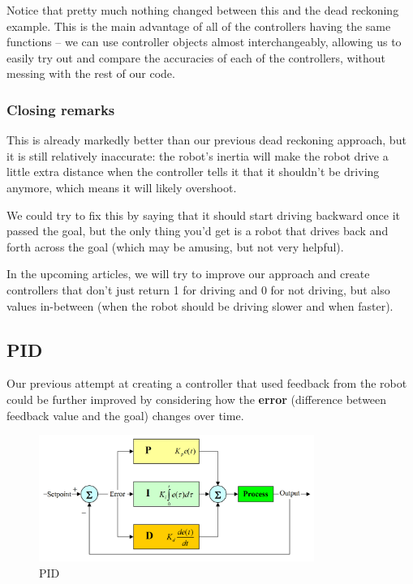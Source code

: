 \documentclass[12pt,twoside]{article}
\begin{document}
Notice that pretty much nothing changed between this and the dead reckoning example. This is the main advantage of all of the controllers having the same functions -- we can use controller objects almost interchangeably, allowing us to easily try out and compare the accuracies of each of the controllers, without messing with the rest of our code.


\subsubsection{Closing remarks}
This is already markedly better than our previous dead reckoning approach, but it is still relatively inaccurate: the robot's inertia will make the robot drive a little extra distance when the controller tells it that it shouldn't be driving anymore, which means it will likely overshoot.

We could try to fix this by saying that it should start driving backward once it passed the goal, but the only thing you'd get is a robot that drives back and forth across the goal (which may be amusing, but not very helpful).

In the upcoming articles, we will try to improve our approach and create controllers that don't just return 1 for driving and 0 for not driving, but also values in-between (when the robot should be driving slower and when faster).




\subsection{PID}
Our previous attempt at creating a controller that used feedback from the robot could be further improved by considering how the \textbf{error} (difference between feedback value and the goal) changes over time.

\begin{figure}[H]
\centering
\includegraphics[width=0.8\textwidth]{../assets/images/motor-controllers/pid.png}
\caption{PID}
\end{figure}
\end{document}
